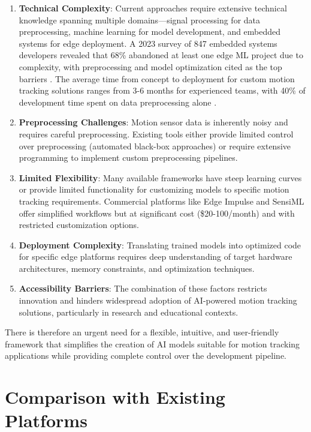 \begin{enumerate}
\item \textbf{Technical Complexity}: Current approaches require extensive technical knowledge spanning multiple domains—signal processing for data preprocessing, machine learning for model development, and embedded systems for edge deployment. A 2023 survey of 847 embedded systems developers revealed that 68\% abandoned at least one edge ML project due to complexity, with preprocessing and model optimization cited as the top barriers \cite{merenda2020edge}. The average time from concept to deployment for custom motion tracking solutions ranges from 3-6 months for experienced teams, with 40\% of development time spent on data preprocessing alone \cite{warden2019tinyml}.

\item \textbf{Preprocessing Challenges}: Motion sensor data is inherently noisy and requires careful preprocessing. Existing tools either provide limited control over preprocessing (automated black-box approaches) or require extensive programming to implement custom preprocessing pipelines.

\item \textbf{Limited Flexibility}: Many available frameworks have steep learning curves or provide limited functionality for customizing models to specific motion tracking requirements. Commercial platforms like Edge Impulse and SensiML offer simplified workflows but at significant cost (\$20-100/month) and with restricted customization options.

\item \textbf{Deployment Complexity}: Translating trained models into optimized code for specific edge platforms requires deep understanding of target hardware architectures, memory constraints, and optimization techniques.

\item \textbf{Accessibility Barriers}: The combination of these factors restricts innovation and hinders widespread adoption of AI-powered motion tracking solutions, particularly in research and educational contexts.

\end{enumerate}

There is therefore an urgent need for a flexible, intuitive, and user-friendly framework that simplifies the creation of AI models suitable for motion tracking applications while providing complete control over the development pipeline.

\section{Comparison with Existing Platforms}

